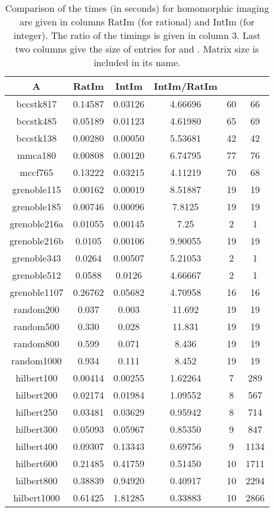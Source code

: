 \documentclass{acm_proc_article-sp}   \usepackage{graphicx,url}
\begin{document}
\begin{table}\centering
\begin{tiny}
\begin{tabular}{|@{}c@{}|@{}c@{}|@{}c@{}|@{}c@{}|@{}c@{}|@{}c@{}|}
\hline
A & RatIm & IntIm & IntIm/RatIm &  & \\\hline
bccstk817   &0.14587    &0.03126    &4.66696 & 60&66\\\hline
bccstk485   &0.05189    &0.01123    &4.61980 & 65&69\\\hline
bccstk138   &0.00280    &0.00050    &5.53681 & 42&42\\\hline
mmca180     &0.00808    &0.00120    &6.74795 & 77&76\\\hline
mccf765     &0.13222    &0.03215    &4.11219 & 70&68\\\hline
grenoble115 &0.00162    &0.00019    &8.51887 & 19&19\\\hline
grenoble185 &0.00746    &0.00096    &7.8125  & 19&19\\\hline
grenoble216a&0.01055    &0.00145    &7.25    & 2&1\\\hline
grenoble216b&0.0105     &0.00106    &9.90055 & 19&19\\\hline
grenoble343 &0.0264     &0.00507    &5.21053 & 2&1\\\hline
grenoble512 &0.0588     &0.0126     &4.66667 & 2&1\\\hline
grenoble1107&0.26762    &0.05682    &4.70958 & 16&16\\\hline
random200   &0.037      &0.003      &11.692  & 19&19\\\hline
random500   &0.330      &0.028      &11.831  & 19&19\\\hline
random800   &0.599      &0.071      &8.436   & 19&19\\\hline
random1000  &0.934      &0.111      &8.452   & 19&19\\\hline\hline
hilbert100  &0.00414    &0.00255    &1.62264 & 7&289\\\hline
hilbert200  &0.02174    &0.01984    &1.09552 & 8&567\\\hline
hilbert250 &0.03481    &0.03629    &0.95942 & 8&714\\\hline
hilbert300  &0.05093    &0.05967    &0.85350 & 9&847\\\hline
hilbert400  &0.09307    &0.13343    &0.69756 & 9&1134\\\hline
hilbert600  &0.21485    &0.41759    &0.51450 & 10&1711\\\hline
hilbert800  &0.38839    &0.94920    &0.40917 & 10&2294\\\hline
hilbert1000 &0.61425    &1.81285    &0.33883 & 10&2866\\\hline
\end{tabular}\caption{Comparison of the times (in seconds) for homomorphic imaging are given in columns RatIm (for rational) and IntIm (for integer). The ratio of the timings is given in column 3. Last two columns give the size of entries for  and . Matrix size is included in its name.}\label{tab:him}
\end{tiny}
\end{table}
\end{document}
